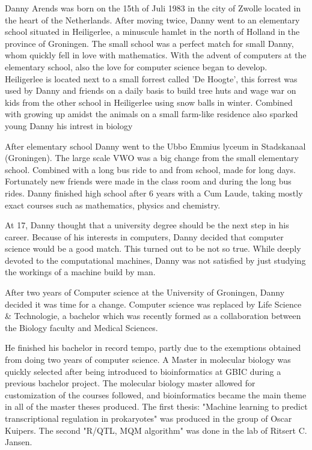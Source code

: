 Danny Arends was born on the 15th of Juli 1983 in the city of Zwolle located in the heart of the 
Netherlands. After moving twice, Danny went to an elementary school situated in Heiligerlee, a minuscule 
hamlet in the north of Holland in the province of Groningen. The small school was a perfect 
match for small Danny, whom quickly fell in love with mathematics. With the advent of 
computers at the elementary school, also the love for computer science began to develop. 
Heiligerlee is located next to a small forrest called 'De Hoogte', this forrest was used 
by Danny and friends on a daily basis to build tree huts and wage war on kids from the other 
school in Heiligerlee using snow balls in winter. Combined with growing up amidst the animals 
on a small farm-like residence also sparked young Danny his intrest in biology 

After elementary school Danny went to the Ubbo Emmius lyceum in Stadskanaal (Groningen). 
The large scale VWO was a big change from the small elementary school. Combined with a 
long bus ride to and from school, made for long days. Fortunately new friends were made in 
the class room and during the long bus rides. Danny finished high school after 6 years with a 
Cum Laude, taking mostly exact courses such as mathematics, physics and chemistry.

At 17, Danny thought that a university degree should be the next step in his career.
Because of his interests in computers, Danny decided that computer science would be a good 
match. This turned out to be not so true. While deeply devoted to the computational machines, 
Danny was not satisfied by just studying the workings of a machine build by man.

After two years of Computer science at the University of Groningen, Danny decided it was time 
for a change. Computer science was replaced by Life Science \& Technologie, a bachelor which 
was recently formed as a collaboration between the Biology faculty and Medical Sciences.

He finished his bachelor in record tempo, partly due to the exemptions obtained from 
doing two years of computer science. A Master in molecular biology was quickly selected after
being introduced to bioinformatics at GBIC during a previous bachelor project. The molecular 
biology master allowed for customization of the courses followed, and bioinformatics became the main 
theme in all of the master theses produced. The first thesis: "Machine learning to predict 
transcriptional regulation in prokaryotes" was produced in the group of Oscar Kuipers. 
The second "R/QTL, MQM algorithm" was done in the lab of Ritsert C. Jansen.

